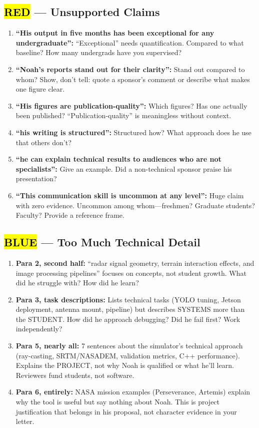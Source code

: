 \documentclass[12pt]{article}
\newcommand{\rd}[1]{{\sethlcolor{red!30}\hl{#1}}}
\newcommand{\blu}[1]{{\sethlcolor{cyan!30}\hl{#1}}}
\begin{document}
\subsection*{\rd{RED} --- Unsupported Claims}

\begin{enumerate}
\item \textbf{``His output in five months has been exceptional for any undergraduate'':} ``Exceptional'' needs quantification. Compared to what baseline? How many undergrads have you supervised?
\item \textbf{``Noah's reports stand out for their clarity'':} Stand out compared to whom? Show, don't tell: quote a sponsor's comment or describe what makes one figure clear.
\item \textbf{``His figures are publication-quality'':} Which figures? Has one actually been published? ``Publication-quality'' is meaningless without context.
\item \textbf{``his writing is structured'':} Structured how? What approach does he use that others don't?
\item \textbf{``he can explain technical results to audiences who are not specialists'':} Give an example. Did a non-technical sponsor praise his presentation?
\item \textbf{``This communication skill is uncommon at any level'':} Huge claim with zero evidence. Uncommon among whom---freshmen? Graduate students? Faculty? Provide a reference frame.
\end{enumerate}

\subsection*{\blu{BLUE} --- Too Much Technical Detail}

\begin{enumerate}
\item \textbf{Para 2, second half:} ``radar signal geometry, terrain interaction effects, and image processing pipelines'' focuses on concepts, not student growth. What did he struggle with? How did he learn?
\item \textbf{Para 3, task descriptions:} Lists technical tasks (YOLO tuning, Jetson deployment, antenna mount, pipeline) but describes SYSTEMS more than the STUDENT. How did he approach debugging? Did he fail first? Work independently?
\item \textbf{Para 5, nearly all:} 7 sentences about the simulator's technical approach (ray-casting, SRTM/NASADEM, validation metrics, C++ performance). Explains the PROJECT, not why Noah is qualified or what he'll learn. Reviewers fund students, not software.
\item \textbf{Para 6, entirely:} NASA mission examples (Perseverance, Artemis) explain why the tool is useful but say nothing about Noah. This is project justification that belongs in his proposal, not character evidence in your letter.
\end{enumerate}
\end{document}
